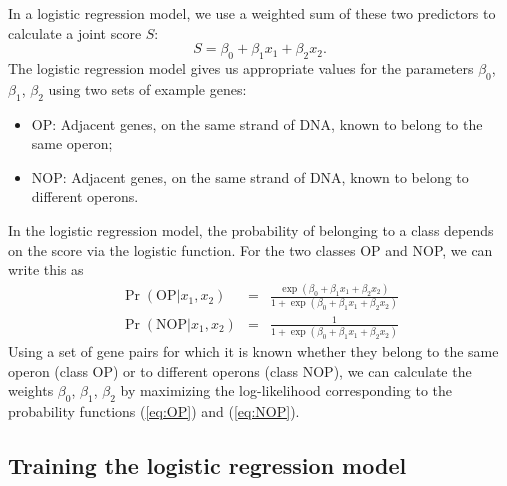 \documentclass{report}
\begin{document}
In a logistic regression model, we use a weighted sum of these two predictors to calculate a joint score $S$:
\begin{equation}
S = \beta_0 + \beta_1 x_1 + \beta_2 x_2.
\end{equation}
The logistic regression model gives us appropriate values for the parameters $\beta_0$, $\beta_1$, $\beta_2$ using two sets of example genes:
\begin{itemize}
\item OP: Adjacent genes, on the same strand of DNA, known to belong to the same operon;
\item NOP: Adjacent genes, on the same strand of DNA, known to belong to different operons.
\end{itemize}

In the logistic regression model, the probability of belonging to a class depends on the score via the logistic function. For the two classes OP and NOP, we can write this as
\begin{eqnarray}
\Pr(\mathrm{OP}|x_1, x_2) & = & \frac{\exp(\beta_0 + \beta_1 x_1 + \beta_2 x_2)}{1+\exp(\beta_0 + \beta_1 x_1 + \beta_2 x_2)} \label{eq:OP} \\
\Pr(\mathrm{NOP}|x_1, x_2) & = & \frac{1}{1+\exp(\beta_0 + \beta_1 x_1 + \beta_2 x_2)} \label{eq:NOP} 
\end{eqnarray}
Using a set of gene pairs for which it is known whether they belong to the same operon (class OP) or to different operons (class NOP), we can calculate the weights $\beta_0$, $\beta_1$, $\beta_2$ by maximizing the log-likelihood corresponding to the probability functions (\ref{eq:OP}) and (\ref{eq:NOP}).

\subsection{Training the logistic regression model}
\label{subsec:LogisticRegressionTraining}
\end{document}

